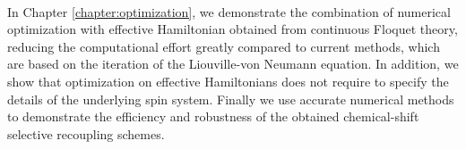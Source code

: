 \\
In Chapter \ref{chapter:optimization}, we demonstrate the combination of numerical optimization with effective Hamiltonian obtained from continuous Floquet theory, reducing the computational effort greatly compared to current methods, which are based on the iteration of the Liouville-von Neumann equation. In addition, we show that optimization on effective Hamiltonians does not require to specify the details of the underlying spin system. %
Finally we use accurate numerical methods to demonstrate the efficiency and robustness of the obtained chemical-shift selective recoupling schemes.
